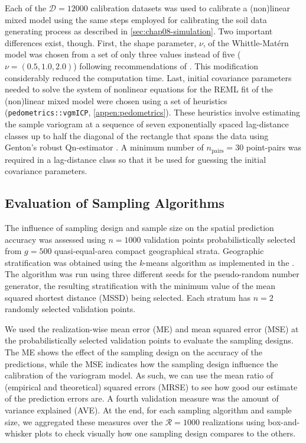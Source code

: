 Each of the $\mathcal{D} = \num{12000}$ calibration datasets was used to calibrate a (non)linear mixed model 
using the same steps employed for calibrating the soil data generating process as described in 
\autoref{sec:chap08-simulation}. Two important differences exist, though. First, the shape parameter, $\nu$, 
of the Whittle-Matérn model was chosen from a set of only three values instead of five ($\nu = (0.5, 1.0, 
2.0)$) following recommendations of \citet{MoyeedEtAl2002}. This modification considerably reduced the 
computation time. Last, initial covariance parameters needed to solve the system of nonlinear equations for 
the REML fit of the (non)linear mixed model \cite{KuenschEtAl2011} were chosen using a set of heuristics 
(\texttt{pedometrics::vgmICP}, \autoref{appen:pedometrics}). These heuristics involve estimating the sample
variogram at a sequence of seven exponentially spaced lag-distance classes up to half the diagonal of the 
rectangle that spans the data using Genton's robust Qn-estimator \cite{Genton1998}. A minimum number of 
$n_\text{pairs} = 30$ point-pairs was required in a lag-distance class so that it be used for guessing the 
initial covariance parameters.

\subsection{Evaluation of Sampling Algorithms}

The influence of sampling design and sample size on the spatial prediction accuracy was assessed using $n = 
1000$ validation points probabilistically selected from $g = 500$ quasi-equal-area compact geographical strata. 
Geographic stratification was obtained using the \textit{k}-means algorithm as implemented in the 
 \cite{WalvoortEtAl2010}. The algorithm was run using three different seeds for the 
pseudo-random number generator, the resulting stratification with the minimum value of the mean squared 
shortest distance (MSSD) being selected. Each stratum has $n = 2$ randomly selected validation points.

We used the realization-wise mean error (ME) and mean squared error (MSE) at the probabilistically selected 
validation points to evaluate the sampling designs. The ME shows the effect of the sampling design on the 
accuracy of the predictions, while the MSE indicates how the sampling design influence the calibration of the 
variogram model. As such, we can use the mean ratio of (empirical and theoretical) squared errors (MRSE) to see 
how good our estimate of the prediction errors are.
A fourth validation measure was the amount of variance explained (AVE). At the end, for each sampling algorithm 
and sample size, we aggregated these measures over the $\mathcal{R} = 1000$ realizations using box-and-whisker 
plots to check visually how one sampling design compares to the others.

